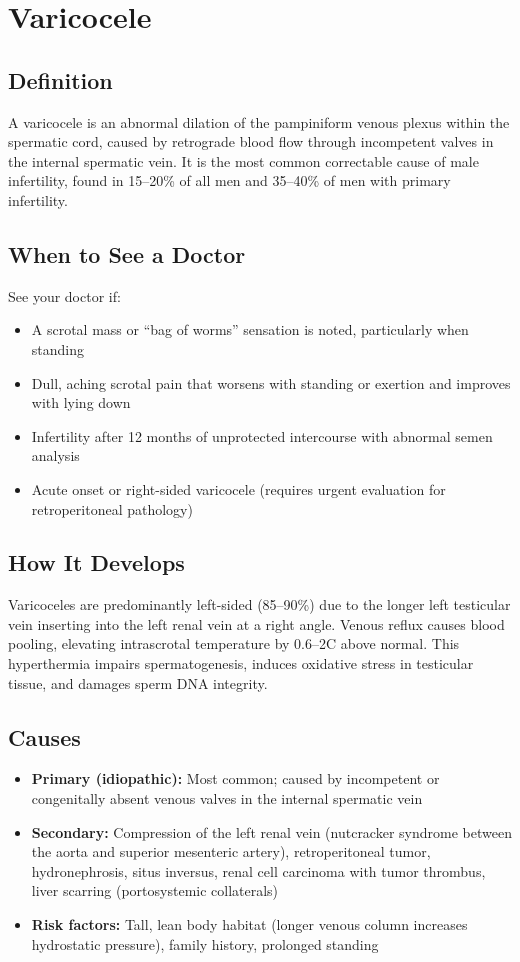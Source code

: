 \chapter{Varicocele}

\section*{Definition}
A varicocele is an abnormal dilation of the pampiniform venous plexus within the spermatic cord, caused by retrograde blood flow through incompetent valves in the internal spermatic vein. It is the most common correctable cause of male infertility, found in 15--20\% of all men and 35--40\% of men with primary infertility.

\section*{When to See a Doctor}
See your doctor if:
\begin{itemize}
  \item A scrotal mass or ``bag of worms'' sensation is noted, particularly when standing
  \item Dull, aching scrotal pain that worsens with standing or exertion and improves with lying down
  \item Infertility after 12 months of unprotected intercourse with abnormal semen analysis
  \item Acute onset or right-sided varicocele (requires urgent evaluation for retroperitoneal pathology)
\end{itemize}

\section*{How It Develops}
Varicoceles are predominantly left-sided (85--90\%) due to the longer left testicular vein inserting into the left renal vein at a right angle. Venous reflux causes blood pooling, elevating intrascrotal temperature by 0.6--2\textdegree{}C above normal. This hyperthermia impairs spermatogenesis, induces oxidative stress in testicular tissue, and damages sperm DNA integrity.

\section*{Causes}
\begin{itemize}
  \item \textbf{Primary (idiopathic):} Most common; caused by incompetent or congenitally absent venous valves in the internal spermatic vein
  \item \textbf{Secondary:} Compression of the left renal vein (nutcracker syndrome between the aorta and superior mesenteric artery), retroperitoneal tumor, hydronephrosis, situs inversus, renal cell carcinoma with tumor thrombus, liver scarring (portosystemic collaterals)
  \item \textbf{Risk factors:} Tall, lean body habitat (longer venous column increases hydrostatic pressure), family history, prolonged standing
\end{itemize}

